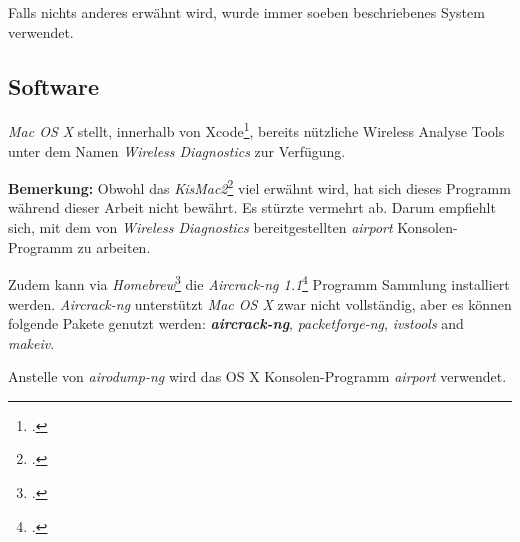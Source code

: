 Falls nichts anderes erwähnt wird, wurde immer soeben beschriebenes System verwendet.


\subsection{Software}
\textit{Mac OS X} stellt, innerhalb von Xcode\footcite{Xcode_Apple_Developer_2015-04-06}, bereits nützliche Wireless Analyse Tools unter dem Namen \textit{Wireless Diagnostics} zur Verfügung.

\begin{framed}
	\textbf{Bemerkung:} Obwohl das \textit{KisMac2}\footcite{IGR_Software_KisMac2_2015-04-06} viel erwähnt wird, hat sich dieses Programm während dieser Arbeit nicht bewährt. Es stürzte vermehrt ab.
	Darum empfiehlt sich, mit dem von \textit{Wireless Diagnostics} bereitgestellten \textit{airport} Konsolen-Programm zu arbeiten.
\end{framed}

Zudem kann via \textit{Homebrew}\footcite{Homebrew__The_missing_package_manager_for_OS_X_2015-04-06} die \textit{Aircrack-ng 1.1}\footcite{Aircrack-ng_2015-04-06} Programm Sammlung installiert werden.
\textit{\textit{Aircrack-ng}} unterstützt \textit{Mac OS X} zwar nicht vollständig, aber es können folgende Pakete genutzt werden: \textbf{\textit{aircrack-ng}}, \textit{packetforge-ng}, \textit{ivstools} and \textit{makeiv}.

Anstelle von \textit{airodump-ng} wird das OS X Konsolen-Programm \textit{airport} verwendet.
